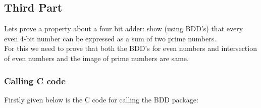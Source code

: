 \documentclass[12pt]{article}
\begin{document}
\subsection{Third Part}

Lets prove a property about a four bit adder: show (using BDD's) that every even 4-bit number can be expressed as a sum of two prime numbers.\\

For this we need to prove that both the BDD's for even numbers and intersection of even numbers and the image of prime numbers are same.\\

\subsubsection{Calling C code}
Firstly given below is the C code for calling the BDD package:\\
\end{document}
